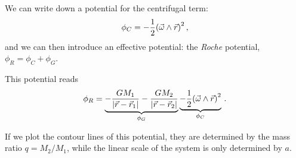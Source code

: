 \documentclass[main.tex]{subfiles}
\begin{document}
We can write down a potential for the centrifugal term: 
%
\begin{align}
\phi _C = - \frac{1}{2} \qty(\vec{\omega} \wedge \vec{r})^2
\,,
\end{align}
%
and we can then introduce an effective potential: the \emph{Roche} potential, \(\phi _R = \phi _C + \phi _G\). 

This potential reads 
%
\begin{align}
\phi _R = \underbrace{-\frac{GM_1}{\abs{\vec{r} - \vec{r}_1} } - \frac{GM_2}{\abs{\vec{r} - \vec{r}_2} }}_{\phi _G} \underbrace{ - \frac{1}{2} \qty(\vec{\omega} \wedge \vec{r})^2}_{\phi _C}
\,.
\end{align}


If we plot the contour lines of this potential, they are determined by the mass ratio \(q = M_2 / M_1 \), while the linear scale of the system is only determined by \(a\).
\end{document}
